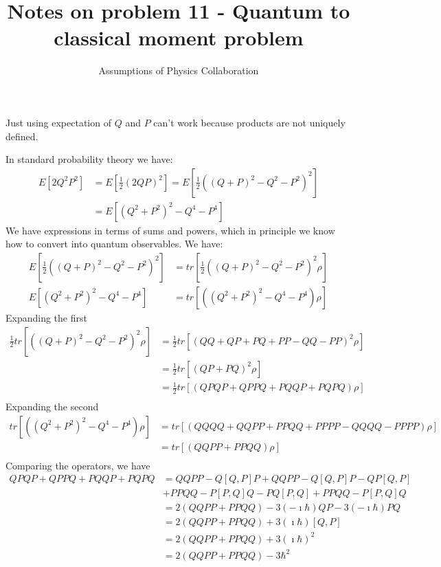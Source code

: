 \documentclass[11pt]{article}
\begin{document}
	\title{Notes on problem 11 - Quantum to classical moment problem}
	\author{Assumptions of Physics Collaboration}

	\date{}

	\maketitle

Just using expectation of $Q$ and $P$ can't work because products
are not uniquely defined.

In standard probability theory we have:
\begin{equation}
\begin{aligned}
	E[2 Q^2 P^2] &= E[\frac{1}{2}(2QP)^2] = E[\frac{1}{2}((Q+P)^2 - Q^2 -P^2)^2] \\
	&= E[(Q^2 + P^2)^2 - Q^4 - P^4]
\end{aligned}
\end{equation}
We have expressions in terms of sums and powers, which in principle we know how to convert into quantum observables. We have:
\begin{equation}
	\begin{aligned}
		E[\frac{1}{2}((Q+P)^2 - Q^2 -P^2)^2] &= tr\left[\frac{1}{2}((Q+P)^2 - Q^2 -P^2)^2 \rho\right] \\
		E[(Q^2 + P^2)^2 - Q^4 - P^4] &= tr\left[((Q^2 + P^2)^2 - Q^4 - P^4)\rho\right]
	\end{aligned}
\end{equation}
Expanding the first
\begin{equation}
	\begin{aligned}
		\frac{1}{2}tr[((Q+P)^2 - Q^2 -P^2)^2 \rho] &= \frac{1}{2}tr[(QQ +QP + PQ + PP - QQ - PP)^2 \rho] \\
		 &= \frac{1}{2}tr[(QP + PQ)^2 \rho] \\
		 &= \frac{1}{2}tr[(QPQP +QPPQ + PQQP + PQPQ) \rho] \\
	\end{aligned}
\end{equation}
Expanding the second
\begin{equation}
	\begin{aligned}
		tr[((Q^2 + P^2)^2 - Q^4 - P^4) \rho] &= tr[(QQQQ + QQPP + PPQQ + PPPP - QQQQ - PPPP) \rho] \\
		&= tr[(QQPP + PPQQ) \rho] \\
	\end{aligned}
\end{equation}
Comparing the operators, we have
\begin{equation}
	\begin{aligned}
		QPQP +QPPQ + PQQP + PQPQ &= QQPP - Q[Q,P]P + QQPP - Q[Q,P]P - QP[Q,P] \\
		&+ PPQQ - P[P, Q] Q - PQ [P, Q] + PPQQ - P [P, Q] Q \\
		&= 2 (QQPP + PPQQ) -3(-\imath\hbar)QP - 3(-\imath\hbar) PQ \\
		&= 2 (QQPP + PPQQ) +3(\imath\hbar)[Q,P]\\
		&= 2 (QQPP + PPQQ) +3(\imath\hbar)^2\\
		&= 2 (QQPP + PPQQ) -3\hbar^2\\
	\end{aligned}
\end{equation}
\end{document}

